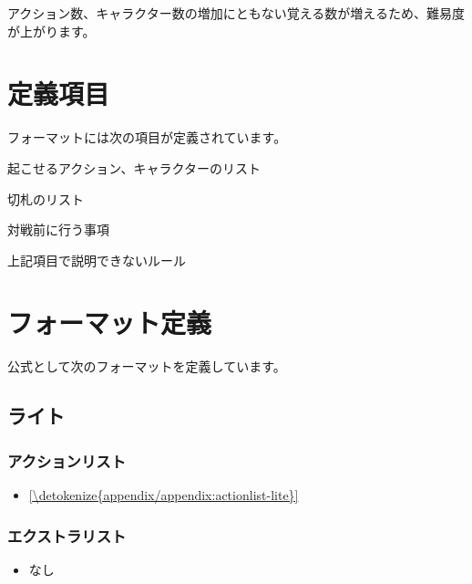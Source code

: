 \documentclass[letterpaper,10pt,dvipdfmx]{sphinxmanual}
\begin{document}
\sphinxAtStartPar
アクション数、キャラクター数の増加にともない覚える数が増えるため、難易度が上がります。


\section{定義項目}
\label{\detokenize{format/format:id6}}
\sphinxAtStartPar
フォーマットには次の項目が定義されています。
\begin{description}
\sphinxAtStartPar
起こせるアクション、キャラクターのリスト

\sphinxAtStartPar
切札のリスト

\sphinxAtStartPar
対戦前に行う事項

\sphinxAtStartPar
上記項目で説明できないルール

\end{description}


\section{フォーマット定義}
\label{\detokenize{format/format:id7}}
\sphinxAtStartPar
公式として次のフォーマットを定義しています。

\sphinxstepscope


\subsection{ライト}
\label{\detokenize{format/lite:format-lite}}\label{\detokenize{format/lite:id1}}\label{\detokenize{format/lite::doc}}

\subsubsection{アクションリスト}
\label{\detokenize{format/lite:id2}}\begin{itemize}
\item {} 
\sphinxAtStartPar
\hyperref[\detokenize{appendix/appendix:actionlist-lite}]{\ref{\detokenize{appendix/appendix:actionlist-lite}} }

\end{itemize}


\subsubsection{エクストラリスト}
\label{\detokenize{format/lite:id3}}\begin{itemize}
\item {} 
\sphinxAtStartPar
なし

\end{itemize}
\end{document}
